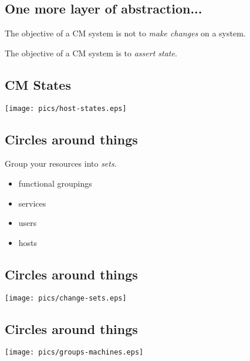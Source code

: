 \documentclass[xga]{xdvislides}
\begin{document}
\subsection{One more layer of abstraction...}
\vspace{.5in}

The objective of a CM system is not to {\em make
changes} on a system. \\

\vspace{.5in}

The objective of a CM system is to {\em assert state}.

\subsection{CM States}
\vspace*{\fill}
\begin{center}
	\texttt{[image: pics/host-states.eps]} \\
\end{center}
\vspace*{\fill}

\subsection{Circles around things}
Group your resources into {\em sets}. \\
\vspace{.5in}

\begin{itemize}
	\item functional groupings
	\item services
	\item users
	\item hosts
\end{itemize}

\subsection{Circles around things}
\vspace*{\fill}
\begin{center}
	\texttt{[image: pics/change-sets.eps]} \\
\end{center}
\vspace*{\fill}

\subsection{Circles around things}
\vspace*{\fill}
\begin{center}
	\texttt{[image: pics/groups-machines.eps]} \\
\end{center}
\vspace*{\fill}
\end{document}
